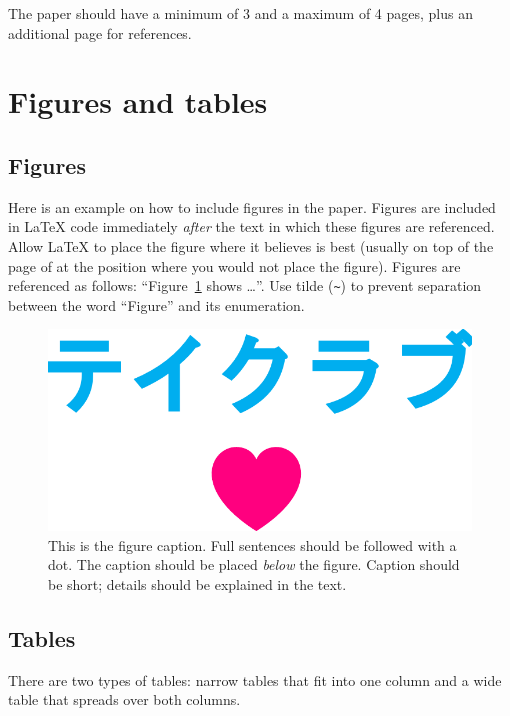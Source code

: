 \documentclass[10pt, a4paper]{article}
\begin{document}
The paper should have a minimum of 3 and a maximum of 4 pages, plus an additional page for references.

\section{Figures and tables}

\subsection{Figures}

Here is an example on how to include figures in the paper.
Figures are included in \LaTeX{} code immediately \textit{after} the text in which these figures are referenced.
Allow \LaTeX{} to place the figure where it believes is best (usually on top of the page of at the position where you would not place the figure).
Figures are referenced as follows: ``Figure~\ref{fig:figure1} shows \dots''.
Use tilde (\verb.~.) to prevent separation between the word ``Figure'' and its enumeration.

\begin{figure}
\begin{center}
\includegraphics[width=\columnwidth]{figures/drawing}
\caption{This is the figure caption. Full sentences should be followed with a dot. The caption should be placed \textit{below} the figure. Caption should be short; details should be explained in the text.}
\label{fig:figure1}
\end{center}
\end{figure}

\subsection{Tables}

There are two types of tables: narrow tables that fit into one column and a wide table that spreads over both columns.
\end{document}
